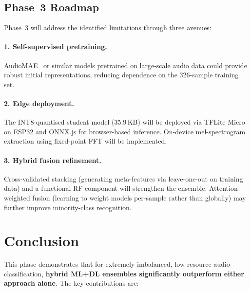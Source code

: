 \documentclass[11pt,a4paper]{article}
\begin{document}
\subsection{Phase~3 Roadmap}

Phase~3 will address the identified limitations through three avenues:

\paragraph{1. Self-supervised pretraining.}
AudioMAE~\cite{xu2022audioMAE} or similar models pretrained on
large-scale audio data could provide robust initial representations,
reducing dependence on the 326-sample training set.

\paragraph{2. Edge deployment.}
The INT8-quantised student model (35.9\,KB) will be deployed via
TFLite Micro on ESP32 and ONNX.js for browser-based inference.
On-device mel-spectrogram extraction using fixed-point FFT will be
implemented.

\paragraph{3. Hybrid fusion refinement.}
Cross-validated stacking (generating meta-features via leave-one-out
on training data) and a functional RF component will strengthen the
ensemble. Attention-weighted fusion (learning to weight models
per-sample rather than globally) may further improve minority-class
recognition.

\section{Conclusion}
\label{sec:conclusion}

This phase demonstrates that for extremely imbalanced, low-resource
audio classification, \textbf{hybrid ML+DL ensembles significantly
outperform either approach alone}. The key contributions are:
\end{document}
